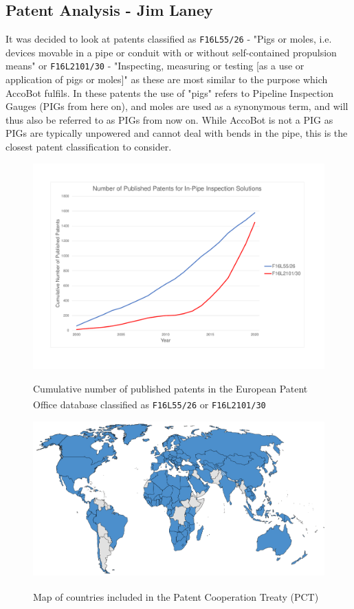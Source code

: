 \documentclass[11pt]{article}		%
\newlength{\imageheight}	 %
\newcommand{\supercite}[1]{\textsuperscript{\cite{#1}}}		%
\begin{document}
	\subsection[Patent Analysis]{Patent Analysis - Jim Laney}

		It was decided to look at patents classified as \verb|F16L55/26| - "Pigs or moles, i.e. devices movable in a pipe or conduit with or without self-contained propulsion means" or \verb|F16L2101/30| - "Inspecting, measuring or testing [as a use or application of pigs or moles]" as these are most similar to the purpose which AccoBot fulfils.
		In these patents the use of "pigs" refers to Pipeline Inspection Gauges (PIGs from here on), and moles are used as a synonymous term, and will thus also be referred to as PIGs from now on.
		While AccoBot is not a PIG as PIGs are typically unpowered and cannot deal with bends in the pipe, this is the closest patent classification to consider.
		\begin{figure}[h]
			\centering
			\begin{multicols}{2}
				\includegraphics[height=\imageheight]{patentGraph}
				\caption{Cumulative number of published patents in the European Patent Office database classified as \texttt{F16L55/26}\supercite{patent26} or \texttt{F16L2101/30}\supercite{patent30}}
				\label{patentGraph}
				\columnbreak
				\includegraphics[height=0.25\textwidth]{pctMap}
				\caption{Map of countries included in the Patent Cooperation Treaty (PCT)\supercite{pct2020states}}
				\label{pctMap}
			\end{multicols}
		\end{figure}
\end{document}
